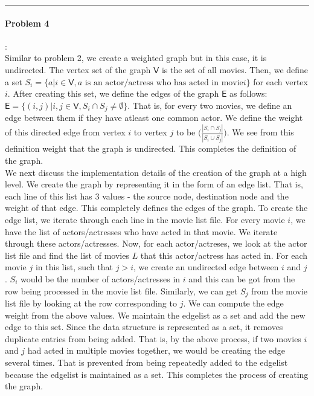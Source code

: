 \documentclass{article}
\newcommand{\V}{\mathsf{V}}
\newcommand{\E}{\mathsf{E}}
\begin{document}
\hrule

\paragraph{Problem 4}:\\
Similar to problem 2, we create a weighted graph but in this case, it is undirected. The vertex set of the graph 
$\V$ is the set of all movies. Then, we define a set 
$ S_i = \{a | i \in \V, a \mbox{ is an actor/actress who has acted in movie} i \}$ for each vertex $i$. After 
creating this set, we define the edges of the graph $\E$ as follows:
$\E = \{(i,j) | i,j \in \V, S_i \cap S_j \neq \emptyset\}$. That is, for every two movies, we define an edge between them
if they have atleast one common actor. We define the weight of this directed edge from vertex $i$ to
vertex $j$ to be $\Big(\frac{|S_i \cap S_j|}{|S_i \cup S_j|}\Big)$. We see from this definition weight that the graph is undirected.
This completes the definition of the graph. \\

We next discuss the implementation details of the creation of the graph at a high level.
We create the graph by representing it in the form of an
edge list. That is, each line of this list has 3 values - the source node, destination node and the weight of that edge. This
completely defines the edges of the graph. To create the edge list, we iterate through each line in the movie list 
file. For every movie $i$, we have the list of actors/actresses who have acted in that movie. We iterate through these 
actors/actresses. Now, for each actor/actreses, we look at the actor list file and find the list of movies $L$ that this 
actor/actress has acted in. For each movie $j$ in this list, such that
$j > i$, we create an undirected edge between $i$ and $j$. $S_i$ would be the number of actors/actresses in $i$ and this can
be got from the row being processed in the movie list file. Similarly, we can get $S_j$ from the movie list file 
by looking at the row corresponding to $j$. We can compute the edge weight from the above values.
We maintain the edgelist as a set and add the new edge to this set. Since the data structure is represented as a set,
it removes duplicate entries from being added. That is, by the above process, if two movies $i$ and $j$ had acted in multiple 
movies together, we would be creating the edge several times. That is prevented from being repeatedly added to the edgelist because
the edgelist is maintained as a set. This completes the process of creating the graph.\\
\end{document}
